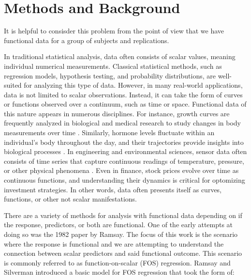 \documentclass[AMA,Times1COL]{WileyNJDv5} %
\begin{document}
\section{Methods and Background}\label{sec2}

It is helpful to consisder this problem from the point of view that we have functional data for a group of subjects and replications.

In traditional statistical analysis, data often consists of scalar values, meaning individual numerical measurements.  Classical statistical methods, such as regression models, hypothesis testing, and probability distributions, are well-suited for analyzing this type of data.  However, in many real-world applications, data is not limited to scalar observations. Instead, it can take the form of curves or functions observed over a continuum, such as time or space. Functional data of this nature appears in numerous disciplines. For instance, growth curves are frequently analyzed in biological and medical research to study changes in body measurements over time \cite{rao_statistical_1958}.  Similarly, hormone levels fluctuate within an individual’s body throughout the day, and their trajectories provide insights into biological processes \cite{brumback_smoothing_1998}. In engineering and environmental sciences, sensor data often consists of time series that capture continuous readings of temperature, pressure, or other physical phenomena \cite{nikolova_curve_2009}. Even in finance, stock prices evolve over time as continuous functions, and understanding their dynamics is critical for optomizing investment strategies\cite{fama_behavior_1965}.  In other words, data often presents itself as curves, functions, or other not scalar manifestations.  

There are a variety of methods for analysis with functional data depending on if the response, predictors, or both are functional.  One of the early attempts at doing so was the 1982 paper by Ramsay\cite{ramsay_when_1982}.  The focus of this work is the scenario where the response is functional and we are attempting to understand the connection between scalar predictors and said functional outcome.  This scenario is commonly referred to as function-on-scalar (FOS) regression.  Ramsay and Silverman\cite{ramsay_functional_2005} introduced a basic model for FOS regression that took the form of:
\end{document}

